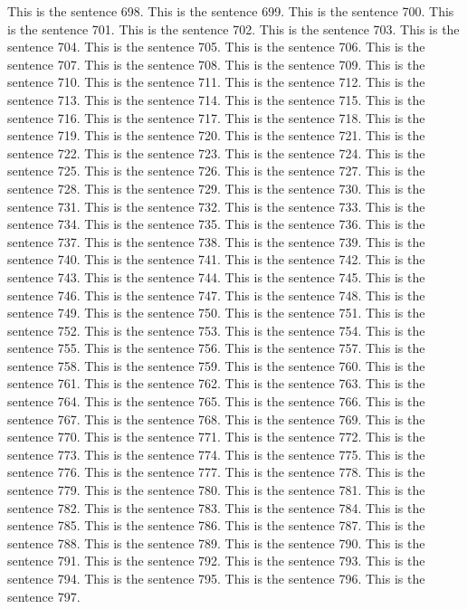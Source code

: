 \documentclass{article}
\begin{document}
This is the sentence 698.
This is the sentence 699.
This is the sentence 700.
This is the sentence 701.
This is the sentence 702.
This is the sentence 703.
This is the sentence 704.
This is the sentence 705.
This is the sentence 706.
This is the sentence 707.
This is the sentence 708.
This is the sentence 709.
This is the sentence 710.
This is the sentence 711.
This is the sentence 712.
This is the sentence 713.
This is the sentence 714.
This is the sentence 715.
This is the sentence 716.
This is the sentence 717.
This is the sentence 718.
This is the sentence 719.
This is the sentence 720.
This is the sentence 721.
This is the sentence 722.
This is the sentence 723.
This is the sentence 724.
This is the sentence 725.
This is the sentence 726.
This is the sentence 727.
This is the sentence 728.
This is the sentence 729.
This is the sentence 730.
This is the sentence 731.
This is the sentence 732.
This is the sentence 733.
This is the sentence 734.
This is the sentence 735.
This is the sentence 736.
This is the sentence 737.
This is the sentence 738.
This is the sentence 739.
This is the sentence 740.
This is the sentence 741.
This is the sentence 742.
This is the sentence 743.
This is the sentence 744.
This is the sentence 745.
This is the sentence 746.
This is the sentence 747.
This is the sentence 748.
This is the sentence 749.
This is the sentence 750.
This is the sentence 751.
This is the sentence 752.
This is the sentence 753.
This is the sentence 754.
This is the sentence 755.
This is the sentence 756.
This is the sentence 757.
This is the sentence 758.
This is the sentence 759.
This is the sentence 760.
This is the sentence 761.
This is the sentence 762.
This is the sentence 763.
This is the sentence 764.
This is the sentence 765.
This is the sentence 766.
This is the sentence 767.
This is the sentence 768.
This is the sentence 769.
This is the sentence 770.
This is the sentence 771.
This is the sentence 772.
This is the sentence 773.
This is the sentence 774.
This is the sentence 775.
This is the sentence 776.
This is the sentence 777.
This is the sentence 778.
This is the sentence 779.
This is the sentence 780.
This is the sentence 781.
This is the sentence 782.
This is the sentence 783.
This is the sentence 784.
This is the sentence 785.
This is the sentence 786.
This is the sentence 787.
This is the sentence 788.
This is the sentence 789.
This is the sentence 790.
This is the sentence 791.
This is the sentence 792.
This is the sentence 793.
This is the sentence 794.
This is the sentence 795.
This is the sentence 796.
This is the sentence 797.
\end{document}
